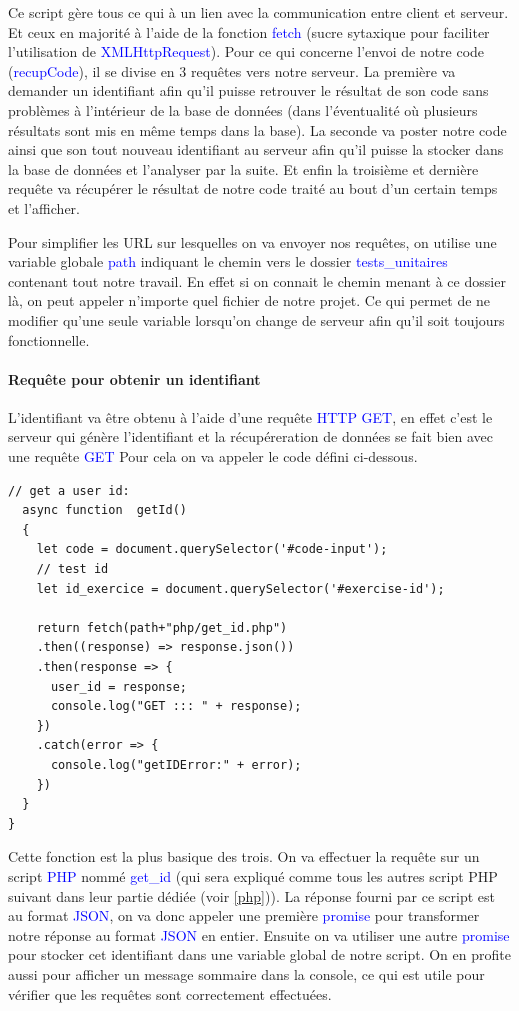 \documentclass[a4paper]{article}
\renewcommand{\texttt}[2][blue]{\textcolor{#1}{\ttfamily #2}}
\begin{document}
Ce script gère tous ce qui à un lien avec la communication entre client et
serveur. Et ceux en majorité à l'aide de la fonction \texttt{fetch} (sucre
sytaxique pour faciliter l'utilisation de \texttt{XMLHttpRequest}). Pour ce qui
concerne l'envoi de notre code (\texttt{recupCode}), il se divise en 3 requêtes
vers notre serveur. La première va demander un identifiant afin qu'il puisse retrouver
le résultat de son code sans problèmes à l'intérieur de la base de données (dans
l'éventualité où plusieurs résultats sont mis en même temps dans la base). La
seconde va poster notre code ainsi que son tout nouveau identifiant au serveur
afin qu'il puisse la stocker dans la base de données et l'analyser par la suite.
Et enfin la troisième et dernière requête va récupérer le résultat de notre
code traité au bout d'un certain temps et l'afficher.

Pour simplifier les URL sur lesquelles on va envoyer nos requêtes, on utilise
une variable globale \texttt{path} indiquant le chemin vers le dossier
\texttt{tests\_unitaires} contenant tout notre travail. En effet si on connait
le chemin menant à ce dossier là, on peut appeler n'importe quel fichier de
notre projet. Ce qui permet de ne modifier qu'une seule variable lorsqu'on
change de serveur afin qu'il soit toujours fonctionnelle.

\paragraph{Requête pour obtenir un identifiant}

L'identifiant va être obtenu à l'aide d'une requête \texttt{HTTP} \texttt{GET},
en effet c'est le serveur qui génère l'identifiant et la récupéreration de
données se fait bien avec une requête \texttt{GET} Pour cela on va appeler le
code défini ci-dessous.

\begin{lstlisting}[language=JS]
  // get a user id:
  async function  getId()
  {
    let code = document.querySelector('#code-input');
    // test id
    let id_exercice = document.querySelector('#exercise-id');

    return fetch(path+"php/get_id.php")
    .then((response) => response.json())
    .then(response => {
      user_id = response;
      console.log("GET ::: " + response);
    })
    .catch(error => {
      console.log("getIDError:" + error);
    })
  }
}
\end{lstlisting}

Cette fonction est la plus basique des trois. On va effectuer la requête sur un
script \texttt{PHP} nommé \texttt{get\_id} (qui sera expliqué comme tous les
autres script PHP suivant dans leur partie dédiée (voir \ref{php})). La réponse
fourni par ce script est au format \texttt{JSON}, on va donc appeler une
première \texttt{promise} pour transformer notre réponse au format
\texttt{JSON} en entier. Ensuite on va utiliser une autre \texttt{promise} pour
stocker cet identifiant dans une variable global de notre script. On en profite
aussi pour afficher un message sommaire dans la console, ce qui est utile pour
vérifier que les requêtes sont correctement effectuées.
\end{document}
